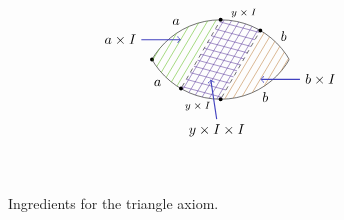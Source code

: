 \begin{figure}[t]
\begin{align*}
\begin{tikzpicture}[baseline]
\node[circle,fill=black,inner sep=1pt] at (-1.73,0) {};
\begin{scope}[yshift=-1cm]
\path[clip] (0,0) circle (2);
\begin{scope}[yshift=2cm]
\draw (0,0) circle (2);
\node[circle,fill=black,inner sep=1pt] (L2) at (-90:2) {};
\node[circle,fill=black,inner sep=1pt] (L1) at (-120:2) {};
\node at (-60:2.25) {$b$};
\node at (-105:2.25) {\scriptsize $y \times I$};
\node at (-135:2.25) {$a$};
\end{scope}
\end{scope}
\begin{scope}[yshift=1cm]
\path[clip] (0,0) circle (2);
\begin{scope}[yshift=-2cm]
\node at (120:2.25) {$a$};
\node at (75:2.25) {\scriptsize $y \times I$};
\node at (45:2.25) {$b$};
\draw (0,0) circle (2);
\node[circle,fill=black,inner sep=1pt] (U1) at (90:2) {};
\node[circle,fill=black,inner sep=1pt] (U2) at (60:2) {};
\end{scope}
\end{scope}
\draw[dashed] (L1) -- (U1);
\draw[dashed] (L2) -- (U2);
\begin{scope}
\path[clip] (0,1) circle (2);
\path[clip] (0,-1) circle (2);
		\foreach \t in {-2.5,-2.3,...,-1.2} {
			\draw[green!50!brown] (\t,-1) -- +(1.19,2);
		}
		\foreach \t in {-1.1,-0.9,...,0} {
			\draw[blue!50!brown] (\t,-1) -- +(1.19,2);
		}
		\foreach \t in {0.1,0.3,...,2.5} {
			\draw[brown] (\t,-1) -- +(1.19,2);
		}
	\foreach \x in {0,1,...,10} {
		\path (L1) to[out=60,in=-120] node[pos=\x/10] (p1\x) {}(U1);
		\path (L2) to[out=60,in=-120] node[pos=\x/10] (p2\x) {} (U2);
		\draw[blue!50!brown] (p1\x.center) -- (p2\x.center);
	}
\end{scope}
\draw[->, thick, blue!75!yellow] (-2,0.5) node[black, left] {$a\times I$} -- (-1,0.5);
\draw[->, thick, blue!75!yellow] (-0.1,-1.5) node[black, below] {$y\times I \times I$} -- (-0.25,-0.5);
\draw[->, thick, blue!75!yellow] (2,-0.5) node[black, right] {$b\times I$} -- (1,-0.5);
\end{tikzpicture}
\end{align*}
\vspace{-1cm}
\caption{Ingredients for the triangle axiom.}
\label{fig:ingredients-triangle-axiom}
\end{figure}

